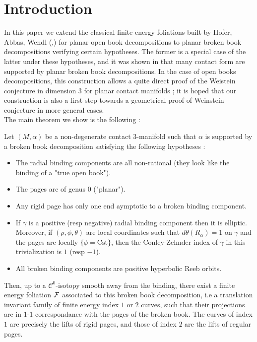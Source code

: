 \documentclass[../main.tex]{subfiles}
\begin{document}
\section{Introduction}

In this paper we extend the classical finite energy foliations built by Hofer, Abbas, Wendl (\cite{wendl_open_2009},\cite{abbas_holomorphic_2011}) for planar open book decompositions to planar broken book decompositions verifying certain hypotheses. The former is a special case of the latter under these hypotheses, and it was shown in \cite{colin_existence_2022} that many contact form are supported by planar broken book decompositions. In the case of open books decompositions, this construction allows a quite direct proof of the Weistein conjecture in dimension $3$ for planar contact manifolds \cite{abbas_weinstein_2005} ; it is hoped that our construction is also a first step towards a geometrical proof of Weinstein conjecture in more general cases.\\

The main theorem we show is the following : 

\begin{theorem}
    Let $(M,\alpha)$ be a non-degenerate contact $3$-manifold such that $\alpha$ is supported by a broken book decomposition satisfying the following hypotheses :
    \begin{itemize}
        \item The radial binding components are all non-rational (they look like the binding of a "true open book").
        \item The pages are of genus 0 ("planar").
        \item Any rigid page has only one end aymptotic to a broken binding component.
        \item If $\gamma$ is a positive (resp negative) radial binding component then it is elliptic. Moreover, if $(\rho,\phi,\theta)$ are local coordinates such that $d\theta(R_\alpha)=1$ on $\gamma$ and the pages are locally $\{\phi = \text{Cst}\}$, then the Conley-Zehnder index of $\gamma$ in this trivialization is $1$ (resp $-1$).
        \item All broken binding components are positive hyperbolic Reeb orbits.
    \end{itemize}

    Then, up to a $\mathcal{C}^0$-isotopy smooth away from the binding, there exist a finite energy foliation $\mathcal{F}$ associated to this broken book decomposition, i.e a translation invariant family of finite energy index $1$ or $2$ curves, such that their projections are in $1$-$1$ correspondance with the pages of the broken book. The curves of index $1$ are precisely the lifts of rigid pages, and those of index $2$ are the lifts of regular pages. 
\end{theorem}
\end{document}

